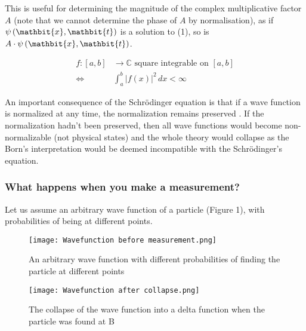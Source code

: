\documentclass{article}
\begin{document}
This is useful for determining the magnitude of the complex multiplicative factor $A$ (note that we cannot determine the phase of $A$ by normalisation), as if $\psi\left(\mathbit{x},\mathbit{t}\right)$ is a solution to (1), so is $A\cdot{\psi}\left(\mathbit{x},\mathbit{t}\right)$. 




\begin{align}
f:[a,b] &\to \mathbb{C} \text{ square integrable on } [a,b] \\
\iff \quad &\int_{a}^{b} |f(x)|^{2} \, dx < \infty
\end{align}


An important consequence of the Schrödinger equation is that if a wave function is normalized at any time, the normalization remains preserved  \cite{Griffiths2004Introduction}.  If the normalization hadn't been preserved, then all wave functions would become non-normalizable (not physical states) and the whole theory would collapse as the Born's interpretation would be deemed incompatible with the Schr\"{o}dinger's equation.


\subsubsection{What happens when you make a measurement?}

Let us assume an arbitrary wave function of a particle (Figure 1), with probabilities of being at different points.



\begin{figure}
\centering
     \texttt{[image: Wavefunction before measurement.png]}
      \caption{An arbitrary wave function with different probabilities of finding the particle at different points}
       \label{fig:Wavefn}
\end{figure}

\begin{figure}
\centering
     \texttt{[image: Wavefunction after collapse.png]}
      \caption{The collapse of the wave function into a delta function when the particle was found at B }
       \label{fig:collapse}
\end{figure}
\end{document}
